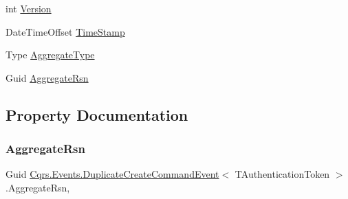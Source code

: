 \begin{DoxyCompactItemize}
\item 
int \hyperlink{classCqrs_1_1Events_1_1DuplicateCreateCommandEvent_ad2d19f109697e676edf4ad7dc7b19bdd}{Version}
\item 
Date\+Time\+Offset \hyperlink{classCqrs_1_1Events_1_1DuplicateCreateCommandEvent_ae732d7442d4eed8329e39a500433c96c}{Time\+Stamp}
\item 
Type \hyperlink{classCqrs_1_1Events_1_1DuplicateCreateCommandEvent_ab08eddd7b1f812bdd62103017fd64f7e}{Aggregate\+Type}
\item 
Guid \hyperlink{classCqrs_1_1Events_1_1DuplicateCreateCommandEvent_a06ead08bb17fa98576201f301971fad2}{Aggregate\+Rsn}
\end{DoxyCompactItemize}


\subsection{Property Documentation}
\mbox{\label{classCqrs_1_1Events_1_1DuplicateCreateCommandEvent_a06ead08bb17fa98576201f301971fad2}} 
\subsubsection{\texorpdfstring{Aggregate\+Rsn}{AggregateRsn}}
{\footnotesize\ttfamily Guid \hyperlink{classCqrs_1_1Events_1_1DuplicateCreateCommandEvent}{Cqrs.\+Events.\+Duplicate\+Create\+Command\+Event}$<$ T\+Authentication\+Token $>$.Aggregate\+Rsn\hspace{0.3cm}{\ttfamily [get]}, {\ttfamily [set]}}

\mbox{\label{classCqrs_1_1Events_1_1DuplicateCreateCommandEvent_ab08eddd7b1f812bdd62103017fd64f7e}} 
